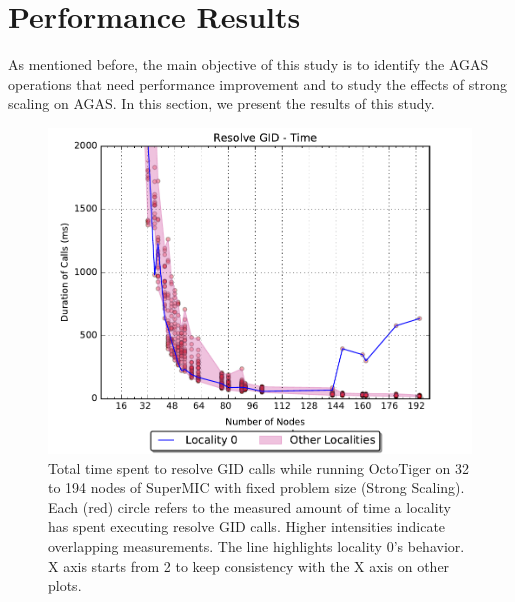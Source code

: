 \section{Performance Results}
\label{results}

As mentioned before, the main objective of this study is to identify the AGAS
operations that need performance improvement and to study the effects of strong
scaling on AGAS. In this section, we present the results of this study.

\begin{figure}[t]
    \centering
    \includegraphics[width=.54\textwidth,height=\textheight,keepaspectratio]{graphs/octotiger_resolve_gid_time}
    \caption{Total time spent to resolve GID calls while running OctoTiger on 32 to 194 nodes of SuperMIC with fixed problem size (Strong Scaling). Each (red) circle refers to the measured amount of time a locality has spent executing resolve GID calls. Higher intensities indicate overlapping measurements. The line highlights locality 0's behavior. X axis starts from 2 to keep consistency with the X axis on other plots.}
    \label{fig:octgr_strong_resolve_gid_time}
\end{figure}


